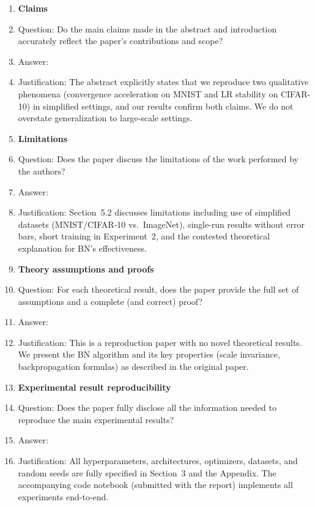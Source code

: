 \documentclass{article}
\begin{document}
\begin{enumerate}

\item \textbf{Claims}
  \item[] Question: Do the main claims made in the abstract and introduction accurately reflect
  the paper's contributions and scope?
  \item[] Answer: \answerYes{}
  \item[] Justification: The abstract explicitly states that we reproduce two qualitative
  phenomena (convergence acceleration on MNIST and LR stability on CIFAR-10) in simplified
  settings, and our results confirm both claims. We do not overstate generalization to
  large-scale settings.

\item \textbf{Limitations}
  \item[] Question: Does the paper discuss the limitations of the work performed by the authors?
  \item[] Answer: \answerYes{}
  \item[] Justification: Section~5.2 discusses limitations including use of simplified datasets
  (MNIST/CIFAR-10 vs.\ ImageNet), single-run results without error bars, short training in
  Experiment~2, and the contested theoretical explanation for BN's effectiveness.

\item \textbf{Theory assumptions and proofs}
  \item[] Question: For each theoretical result, does the paper provide the full set of
  assumptions and a complete (and correct) proof?
  \item[] Answer: \answerNA{}
  \item[] Justification: This is a reproduction paper with no novel theoretical results. We
  present the BN algorithm and its key properties (scale invariance, backpropagation formulas)
  as described in the original paper.

\item \textbf{Experimental result reproducibility}
  \item[] Question: Does the paper fully disclose all the information needed to reproduce the
  main experimental results?
  \item[] Answer: \answerYes{}
  \item[] Justification: All hyperparameters, architectures, optimizers, datasets, and random
  seeds are fully specified in Section~3 and the Appendix. The accompanying code notebook
  (submitted with the report) implements all experiments end-to-end.


\end{enumerate}
\end{document}
